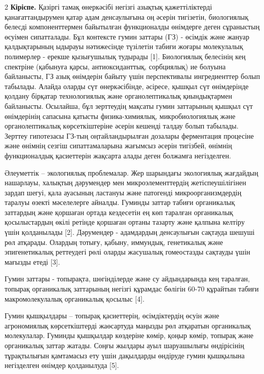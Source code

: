 \begin{multicols}{2}
{\bfseries Кіріспе.} Қазіргі тамақ өнеркәсібі негізгі азықтық
қажеттіліктерді қанағаттандырумен қатар адам денсаулығына оң әсерін
тигізетін, биологиялық белесді компоненттермен байытылған функционалды
өнімдерге деген сұраныстың өсуімен сипатталады. Бұл контексте гумин
заттары (ГЗ) - өсімдік және жануар қалдықтарының ыдырауы нәтижесінде
түзілетін табиғи жоғары молекулалық полимерлер - ерекше қызығушылық
тудырады {[}1{]}. Биологиялық белесінің кең спектріне (қабынуға қарсы,
антиоксиданттық, сорбциялық) ие болуына байланысты, ГЗ азық өнімдерін
байыту үшін перспективалы ингредиенттер болып табылады. Алайда оларды
сүт өнеркәсібінде, әсіресе, қышқыл сүт өнімдерінде қолдану бірқатар
технологиялық және органолептикалық қиындықтармен байланысты. Осылайша,
бұл зерттеудің мақсаты гумин заттарының қышқыл сүт өнімдерінің сапасына
қатысты физика-химиялық, микробиологиялық және органолептикалық
көрсеткіштеріне әсерін кешенді талдау болып табылады. Зерттеу гипотезасы
ГЗ-тың оңтайландырылған дозалары ферментация процесіне және өнімнің
сезгіш сипаттамаларына жағымсыз әсерін тигізбей, өнімнің функционалдық
қасиеттерін жақсарта алады деген болжамға негізделген.

Әлеуметтік -- экологиялық проблемалар. Жер шарындағы экологиялық
жағдайдың нашарлауы, халықтың дәрумендер мен микроэлементтердің
жетіспеушілігінен зардап шегуі, қала ауасының ластануы және патогенді
микроорганизмдердің таралуы өзекті мәселелерге айналды. Гуминды заттар
табиғи органикалық заттардың және қоршаған ортада кездесетін ең көп
таралған органикалық қосылыстардың өкілі ретінде қоршаған ортаны тазарту
және қалпына келтіру үшін қолданылады {[}2{]}. Дәрумендер - адамдардың
денсаулығын сақтауда шешуші рөл атқарады. Олардың тотығу, қабыну,
иммундық, генетикалық және эпигенетикалық реттеудегі рөлі оларды
жасушалық гомеостазды сақтауды үшін мағызды етеді {[}3{]}.

Гумин заттары - топырақта, шөгінділерде және су айдындарында кең
таралған, топырақ органикалық заттарының негізгі құрамдас бөлігін 60-70
құрайтын табиғи макромолекулалық органикалық қосылыс {[}4{]}.

Гумин қышқылдары -- топырақ қасиеттерің, өсімдіктердің өсуін және
агрономиялық көрсеткіштерді жаөсартуда маңызды рөл атқаратын органикалық
молекулалар. Гуминды қышқылдар көздеріне көмір, қоңыр көмір, топырақ
және органикалық заттар жатады. Соңғы жылдары ауыл шаруашылығы
өндірісінің тұрақтылығын қамтамасыз ету үшін дақылдарды өндіруде гумин
қышқылына негізделген өнімдер қолданылуда {[}5{]}.


\end{multicols}
